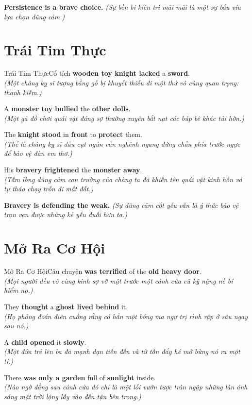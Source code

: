 \begin{baihoc}
  \textbf{Persistence is a brave choice.} \textit{(Sự bền bỉ kiên trì mãi mãi là một sự bấu víu lựa chọn dũng cảm.)}
\end{baihoc}

\vspace{0.8cm}

\ngayDay{}
\section{Trái Tim Thực}
\begin{truyen}{Trái Tim Thực}{Cổ tích}
 \textbf{wooden toy knight lacked} a \textbf{sword}.\\
\textit{(Một chàng kỵ sĩ tượng bằng gỗ bị khuyết thiếu đi một thứ vô cùng quan trọng: thanh kiếm.)}

A \textbf{monster toy bullied} the \textbf{other dolls}.\\
\textit{(Một gã đồ chơi quái vật đáng sợ thường xuyên bắt nạt các búp bê khác tủi hờn.)}

The \textbf{knight stood} in \textbf{front} to \textbf{protect} them.\\
\textit{(Thế là chàng kỵ sĩ dẫu cụt ngủn vẫn nghênh ngang đứng chắn phía trước ngực để bảo vệ đàn em thơ.)}

His \textbf{bravery frightened} the \textbf{monster away}.\\
\textit{(Tấm lòng dũng cảm can trường của chàng ta đã khiến tên quái vật kinh hồn và tự tháo chạy trốn đi mất đất.)}
\end{truyen}

\begin{baihoc}
  \textbf{Bravery is defending the weak.} \textit{(Sự dũng cảm cốt yếu vẫn là ý thức bảo vệ trọn vẹn được những kẻ yếu đuối hơn ta.)}
\end{baihoc}

\vspace{0.8cm}

\ngayDay{}
\section{Mở Ra Cơ Hội}
\begin{truyen}{Mở Ra Cơ Hội}{Câu chuyện}
 \textbf{was terrified} of the \textbf{old heavy door}.\\
\textit{(Mọi người đều vô cùng kinh sợ vỡ mật trước một cánh cửa cũ kỹ nặng nề bí hiểm nọ.)}

They \textbf{thought} a \textbf{ghost lived behind} it.\\
\textit{(Họ phỏng đoán điên cuồng rằng có hẳn một bóng ma ngự trị rình rập ở sâu ngay sau nó.)}

A \textbf{child opened} it \textbf{slowly}.\\
\textit{(Một đứa trẻ lên ba đã mạnh dạn tiến đến và từ tốn đẩy hé mở bừng nó ra một tí.)}

There \textbf{was only a garden} full of \textbf{sunlight} inside.\\
\textit{(Nào ngờ đằng sau cánh cửa đó chỉ là một lối vườn tược tràn ngập những làn ánh sáng mặt trời lộng lẫy vào đến tận bên trong.)}
\end{truyen}

